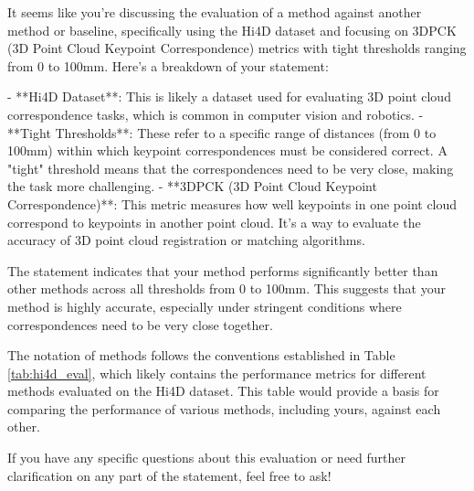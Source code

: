 It seems like you're discussing the evaluation of a method against another method or baseline, specifically using the Hi4D dataset and focusing on 3DPCK (3D Point Cloud Keypoint Correspondence) metrics with tight thresholds ranging from 0 to 100mm. Here's a breakdown of your statement:

- **Hi4D Dataset**: This is likely a dataset used for evaluating 3D point cloud correspondence tasks, which is common in computer vision and robotics.
- **Tight Thresholds**: These refer to a specific range of distances (from 0 to 100mm) within which keypoint correspondences must be considered correct. A "tight" threshold means that the correspondences need to be very close, making the task more challenging.
- **3DPCK (3D Point Cloud Keypoint Correspondence)**: This metric measures how well keypoints in one point cloud correspond to keypoints in another point cloud. It's a way to evaluate the accuracy of 3D point cloud registration or matching algorithms.

The statement indicates that your method performs significantly better than other methods across all thresholds from 0 to 100mm. This suggests that your method is highly accurate, especially under stringent conditions where correspondences need to be very close together.

The notation of methods follows the conventions established in Table \ref{tab:hi4d_eval}, which likely contains the performance metrics for different methods evaluated on the Hi4D dataset. This table would provide a basis for comparing the performance of various methods, including yours, against each other.

If you have any specific questions about this evaluation or need further clarification on any part of the statement, feel free to ask!